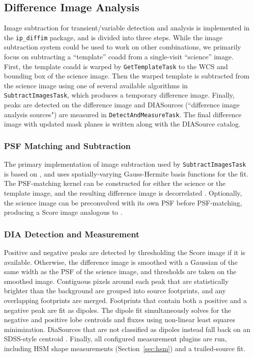 \subsection{Difference Image Analysis}
\label{sec:dia}

Image subtraction for transient/variable detection and analysis is implemented in the \texttt{ip\_diffim} package, and is divided into three steps.
While the image subtraction system could be used to work on other combinations, we primarily focus on subtracting a ``template'' coadd from a single-visit ``science'' image.
First, the template coadd is warped by \texttt{GetTemplateTask} to the WCS and bounding box of the science image.
Then the warped template is subtracted from the science image using one of several available algorithms in \texttt{SubtractImagesTask}, which produces a temporary difference image.
Finally, peaks are detected on the difference image and DIASources (``difference image analysis sources") are measured in \texttt{DetectAndMeasureTask}.
The final difference image with updated mask planes is written along with the DIASource catalog.

\subsubsection{PSF Matching and Subtraction}

The primary implementation of image subtraction used by \texttt{SubtractImagesTask} is based on \citet{1998ApJ...503..325A}, and uses spatially-varying Gauss-Hermite basis functions for the fit.
The PSF-matching kernel can be constructed for either the science or the template image, and the resulting difference image is decorrelated \citet{DMTN-021}.
Optionally, the science image can be preconvolved with its own PSF before PSF-matching, producing a Score image analogous to \citet{2016ApJ...830...27Z}.



\subsubsection{DIA Detection and Measurement}
\label{sec:detectAndMeasureDiaSource}

Positive and negative peaks are detected by thresholding the Score image if it is available.
Otherwise, the difference image is smoothed with a Gaussian of the same width as the PSF of the science image, and thresholds are taken on the smoothed image.
Contiguous pixels around each peak that are statistically brighter than the background are grouped into source footprints, and any overlapping footprints are merged.
Footprints that contain both a positive and a negative peak are fit as dipoles.
The dipole fit simultaneously solves for the negative and positive lobe centroids and fluxes using non-linear least squares minimization.
DiaSources that are not classified as dipoles instead fall back on an SDSS-style centroid \citep{2003AJ....125.1559P}.
Finally, all configured measurement plugins are run, including HSM shape measurements (Section~\ref{sec:hsm}) and a trailed-source fit.

